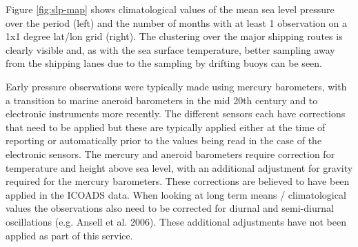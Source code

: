 Figure \ref{fig:slp-map} shows climatological values of the mean sea level pressure over the period \datatimerange{} (left) and the number of months with at least 1 observation on a 1x1 degree lat/lon grid (right).
The clustering over the major shipping routes is clearly visible and, as with the sea surface temperature, better sampling away from the shipping lanes due to the sampling by drifting buoys can be seen.

Early pressure observations were typically made using mercury barometers, with a transition to marine aneroid barometers in the mid 20th century and to electronic instruments more recently. 
The different sensors each have corrections that need to be applied but these are typically applied either at the time of reporting or automatically prior to the values being read in the case of the electronic sensors. 
The mercury and aneroid barometers require correction for temperature and height above sea level, with an additional adjustment for gravity required for the mercury barometers. 
These corrections are believed to have been applied in the ICOADS data.
When looking at long term means / climatological values the observations also need to be corrected for diurnal and semi-diurnal oscillations (e.g. Ansell et al. 2006). These additional adjustments have not been applied as part of this service.

